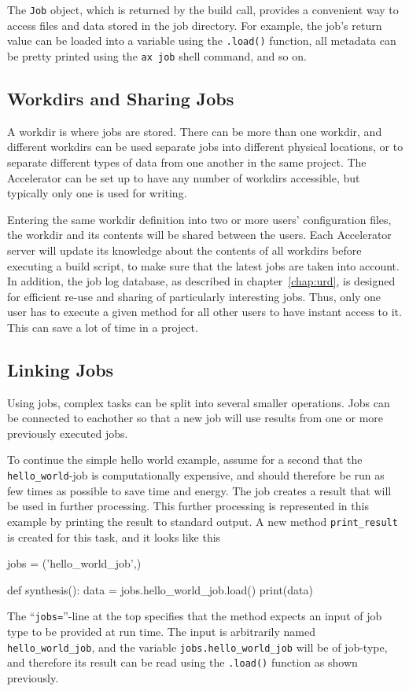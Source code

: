 The \texttt{Job} object, which is returned by the build call, provides
a convenient way to access files and data stored in the job directory.
For example, the job's return value can be loaded into a variable
using the \texttt{.load()} function, all metadata can be pretty
printed using the \texttt{ax job} shell command, and so on.



\subsection{Workdirs and Sharing Jobs}

A workdir is where jobs are stored.  There can be more than one
workdir, and different workdirs can be used separate jobs into
different physical locations, or to separate different types of data
from one another in the same project.  The Accelerator can be set up
to have any number of workdirs accessible, but typically only one is
used for writing.

Entering the same workdir definition into two or more users'
configuration files, the workdir and its contents will be shared
between the users.  Each Accelerator server will update its knowledge
about the contents of all workdirs before executing a build script, to
make sure that the latest jobs are taken into account.  In addition,
the job log database, as described in chapter~\ref{chap:urd}, is
designed for efficient re-use and sharing of particularly interesting
jobs.  Thus, only one user has to execute a given method for all other
users to have instant access to it.  This can save a lot of time in a
project.


\subsection{Linking Jobs}

Using jobs, complex tasks can be split into several smaller
operations.  Jobs can be connected to eachother so that a new job will
use results from one or more previously executed jobs.

To continue the simple hello world example, assume for a second that
the \texttt{hello\_world}-job is computationally expensive, and should
therefore be run as few times as possible to save time and energy.
The job creates a result that will be used in further processing.
This further processing is represented in this example by printing the
result to standard output.  A new method \texttt{print\_result} is
created for this task, and it looks like this
\begin{python}
jobs = ('hello_world_job',)

def synthesis():
    data = jobs.hello_world_job.load() 
    print(data)
\end{python}
The ``\texttt{jobs=}''-line at the top specifies that the method
expects an input of job type to be provided at run time.  The input is
arbitrarily named \texttt{hello\_world\_job}, and the variable
\texttt{jobs.hello\_world\_job} will be of job-type, and therefore its
result can be read using the \texttt{.load()} function as shown
previously.

